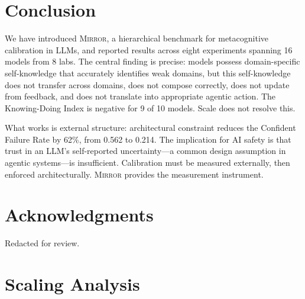 \documentclass[10pt]{article}
\newcommand{\mirror}{\textsc{Mirror}}
\begin{document}
\vspace{-1mm}
\section{Conclusion}
\label{sec:conclusion}

We have introduced \mirror{}, a hierarchical benchmark for metacognitive
calibration in LLMs, and reported results across eight experiments spanning 16
models from 8 labs. The central finding is precise: models possess domain-specific
self-knowledge that accurately identifies weak domains, but this self-knowledge
does not transfer across domains, does not compose correctly, does not update from
feedback, and does not translate into appropriate agentic action. The Knowing-Doing
Index is negative for 9 of 10 models. Scale does not resolve this.

What works is external structure: architectural constraint reduces the Confident
Failure Rate by 62\%, from 0.562 to 0.214. The implication for AI safety is that
trust in an LLM's self-reported uncertainty---a common design assumption in agentic
systems---is insufficient. Calibration must be measured externally, then enforced
architecturally. \mirror{} provides the measurement instrument.

\section*{Acknowledgments}

Redacted for review.

\FloatBarrier



\newpage
\appendix

\section{Scaling Analysis}
\label{app:scaling}
\end{document}
